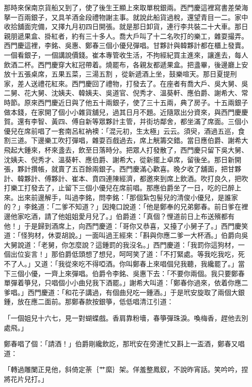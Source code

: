 那時來保南京貨船又到了，使了後生王顯上來取單稅銀兩。西門慶這裡寫書差榮海拏一百兩銀子，又具羊酒金段禮物謝主事。就說此船貨過稅，還望青目一二。家中收拾舖面完備，又擇九月初四日開張。就是那日卸貨，連行李共裝二十大車。那日親朋遞果盒、掛紅者，約有三十多人。喬大戶叫了十二名吹打的樂工，雜耍撮弄。西門慶這裡，李銘、吳惠、鄭春三個小優兒彈唱。甘夥計與韓夥計都在櫃上發賣。一個看銀子，一個講說價錢。崔本專管收生活，不拘經紀買主進來，讓進去，每人飲酒二杯。西門慶穿大紅冠帶着。燒罷布，各親友都遞果盒。把盞畢，後邊廳上安放十五張桌席，五果五菜，三湯五割 ，從新遞酒上坐，鼓樂喧天。那日夏提刑家，差人送禮花紅來。西門慶回了禮物，打發去了。在座者有喬大戶、吳大舅、吳二舅、花大舅、沈姨夫、韓姨夫、吳道官、倪秀才、溫葵軒、應伯爵、謝希大、常時節。原來西門慶近日與了他五十兩銀子，使了三十五兩，典了房子。十五兩銀子做本錢，在家開了個小小雜貨舖兒，過其日月不題。近隨眾出分資來，與西門慶慶賀。還有李智、黃四、傅自新等眾夥計主管，并街坊鄰舍，都坐滿了席面。三個小優兒在席前唱了一套南呂紅衲襖：「混元初，生太極」云云。須臾，酒過五巡，食割三道。下邊樂工吹打彈唱，雜耍百戲過去，席上觥籌交錯。當日應伯爵、謝希大飛起大鍾來，杯來盞去，飲至日落時分。把眾人打發散了，西門慶只留下吳大舅、沈姨夫、倪秀才、溫葵軒、應伯爵、謝希大，從新擺上卓席，留後坐。那日新開張，夥計攢帳，就賣了五百餘兩銀子。西門慶滿心歡喜。晚夕收了舖面，把甘夥計、韓夥計、傅夥計、崔本、賁四連陳經濟，都邀來到席上飲酒。吹打良久，把吹打樂工打發去了，止留下三個小優兒在席前唱。那應伯爵坐了一日，吃的已醉上來。出來前邊解手，叫過李銘，問李銘：「那個紮包髻兒的清俊小優兒，是誰家的？」李銘道：「二爹不知道？」因掩口說道：「他是鄭奉的兄弟鄭春。前日爹在裡邊他家吃酒，請了他姐姐愛月兒了。」伯爵道：「真個？悝道前日上布送殯都有他！」于是歸到酒席上，向西門慶道：「哥你又恭喜，又擡了小舅子了。」西門慶笑道：「怪狗材，休耍胡說。」一面叫過王經來：「斟與你應二爹一大杯酒。」伯爵向吳大舅說道：「老舅，你怎麼說？這鍾罰的我沒名。」西門慶道：「我罰你這狗材，一個出位妄言！」那伯爵低頭想了想兒，呵呵笑了道：「不打緊處。等我吃我吃，死不了人。」又道：「我從來吃不得啞酒。你叫鄭春上來唱個兒我聽，我纔罷了。」當下三個小優，一齊上來彈唱。伯爵令李銘、吳惠下去：「不要你兩個。我只要鄭春單彈着箏兒，只唱個小小曲兒我下酒罷。」謝希大叫道：「鄭春你過來，依着你應二爹唱。」西門慶道：「和花子講過，有個曲兒吃一鍾酒。」于是玳安旋取了兩個大銀鍾，放在應二面前。那鄭春款按銀箏，低低唱清江引道：

「一個姐兒十六七，見一對蝴蝶戲。香肩靠粉墻，春箏彈珠淚。喚梅香，趕他去別處飛。」

鄭春唱了個：「請酒！」伯爵剛纔飲訖，那玳安在旁連忙又斟上一盃酒，鄭春又唱道：

「轉過雕闌正見他，斜倚定荼｛艹縻｝架。佯羞整鳳釵，不說昨宵話。笑吟吟，捏將花片兒打。」

